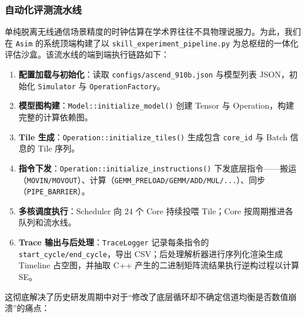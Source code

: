 \documentclass{CjC}
\begin{document}
    \subsubsection{自动化评测流水线}
    单纯脱离无线通信场景精度的时钟估算在学术界往往不具物理说服力。为此，我们在 \texttt{Asim}
    的系统顶端构建了以 \texttt{skill\_experiment\_pipeline.py} 为总枢纽的一体化评估沙盒。该流水线的端到端执行链路如下：

    \begin{enumerate}
        \item \textbf{配置加载与初始化}：读取 \texttt{configs/ascend\_910b.json}
            与模型列表 JSON，初始化 \texttt{Simulator} 与 \texttt{OperationFactory}。

        \item \textbf{模型图构建}：\texttt{Model::initialize\_model()} 创建 Tensor
            与 Operation，构建完整的计算依赖图。

        \item \textbf{Tile 生成}：\texttt{Operation::initialize\_tiles()} 生成包含
            \texttt{core\_id} 与 Batch 信息的 Tile 序列。

        \item \textbf{指令下发}：\texttt{Operation::initialize\_instructions()} 下发底层指令——搬运（\texttt{MOVIN/MOVOUT}）、计算（\texttt{GEMM\_PRELOAD/GEMM/ADD/MUL/...}）、同步（\texttt{PIPE\_BARRIER}）。

        \item \textbf{多核调度执行}：Scheduler 向 24 个 Core 持续投喂 Tile；Core
            按周期推进各队列和流水线。

        \item \textbf{Trace 输出与后处理}：\texttt{TraceLogger} 记录每条指令的 \texttt{start\_cycle/end\_cycle}，导出
            CSV；后处理解析器进行序列化渲染生成 Timeline 占空图，并抽取 C++ 产生的二进制矩阵流结果执行逆构过程以计算
            SE。
    \end{enumerate}

    这彻底解决了历史研发周期中对于“修改了底层循环却不确定信道均衡是否数值崩溃”的痛点：
\end{document}
